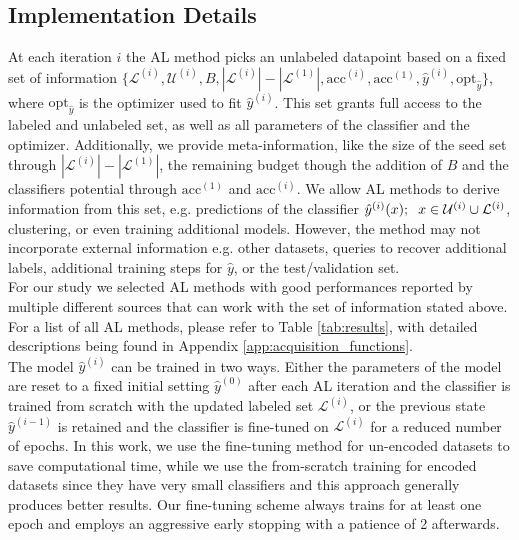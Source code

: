 \documentclass[]{article}
\begin{document}
\subsection{Implementation Details}\label{sec:implementation_details}
At each iteration $i$ the AL method picks an unlabeled datapoint based on a fixed set of information $\{\mathcal{L}^{(i)}, \mathcal{U}^{(i)}, B, |\mathcal{L}^{(i)}|-|\mathcal{L}^{(1)}|, \text{acc}^{(i)}, \text{acc}^{(1)}, \hat y^{(i)}, \text{opt}_{\hat y}\}$, where $\text{opt}_{\hat y}$ is the optimizer used to fit $\hat y^{(i)}$.
This set grants full access to the labeled and unlabeled set, as well as all parameters of the classifier and the optimizer.
Additionally, we provide meta-information, like the size of the seed set through $|\mathcal{L}^{(i)}|-|\mathcal{L}^{(1)}|$, the remaining budget though the addition of $B$ and the classifiers potential through $\text{acc}^{(1)}$ and $\text{acc}^{(i)}$.
We allow AL methods to derive information from this set, e.g. predictions of the classifier $\hat y^{(i)}(x); \hspace{2mm} x \in \mathcal{U}^{(i)} \cup \mathcal{L}^{(i)}$, clustering, or even training additional models.
However, the method may not incorporate external information e.g. other datasets, queries to recover additional labels, additional training steps for $\hat y$, or the test/validation set. \\
For our study we selected AL methods with good performances reported by multiple different sources that can work with the set of information stated above.
For a list of all AL methods, please refer to Table \ref{tab:results}, with detailed descriptions being found in Appendix \ref{app:acquisition_functions}. \\ [1mm]
%
The model $\hat y^{(i)}$ can be trained in two ways. Either the parameters of the model are reset to a fixed initial setting $\hat y^{(0)}$ after each AL iteration and the classifier is trained from scratch with the updated labeled set $\mathcal{L}^{(i)}$, or the previous state $\hat y^{(i-1)}$ is retained and the classifier is fine-tuned on $\mathcal{L}^{(i)}$ for a reduced number of epochs.
In this work, we use the fine-tuning method for un-encoded datasets to save computational time, while we use the from-scratch training for encoded datasets since they have very small classifiers and this approach generally produces better results.
Our fine-tuning scheme always trains for at least one epoch and employs an aggressive early stopping with a patience of 2 afterwards.
\end{document}
